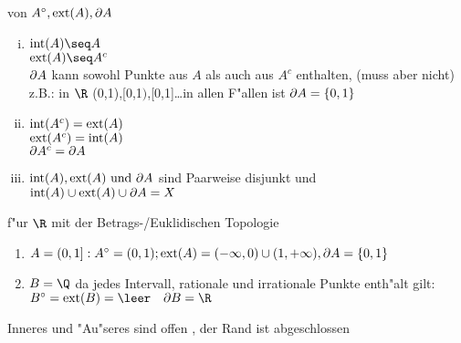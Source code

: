 \begin{beob}\label{2.28}{von $A^\circ,\mbox{ext}(A),\partial A$}
\begin{enumerate}[(i)]
\item $\mbox{int}(A)\seq A$\\
$\ext{A}\seq A^c$\\
$\partial A$ kann sowohl Punkte aus $A$ als auch aus $A^c$ enthalten, (muss  aber nicht)\\
z.B.: in $\R$ (0,1),[0,1$)$,[0,1]\dots in allen F"allen ist $\partial A=\{0,1\}$
\item $\mbox{int}(A^c)=\mbox{ext}(A)$\\
$\mbox{ext}(A^c)=\mbox{int}(A)$\\
$\partial A^c=\partial A$
\item $\mbox{int}(A),\mbox{ext}(A) \mbox{ und }\partial A$ sind Paarweise disjunkt und $\mbox{int}(A)\cup\mbox{ext}(A) \cup\partial A=X$
\end{enumerate}
\end{beob}
\begin{beispiel}\label{2.29}{f"ur $\R$ mit der Betrags-/Euklidischen Topologie}
\begin{enumerate}
\item $A=(0,1]: A^\circ =(0,1);\mbox{ext}(A)=(-\infty,0)\cup (1,+\infty) ,\partial A =\{ 0,1\}$
\item $B=\Q$ da jedes Intervall, rationale und irrationale Punkte enth"alt gilt:\\
$\inn{B}=\ext{B} =\leer\quad \bd{B}=\R$
\end{enumerate}
\end{beispiel}

\begin{prop}\label{2.30}
Inneres und "Au"seres sind offen , der Rand ist abgeschlossen
\end{prop}


